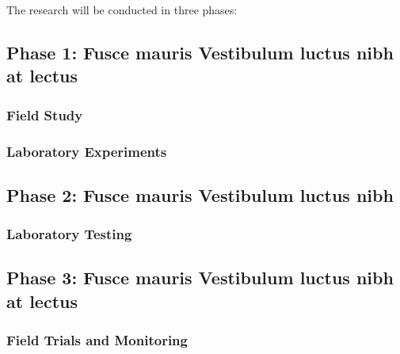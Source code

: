The research will be conducted in three phases:

\subsection{Phase 1: Fusce mauris Vestibulum luctus nibh at lectus}

\subsubsection{Field Study}
\lipsum[5]

\subsubsection{Laboratory Experiments}
\lipsum[5]



\subsection{Phase 2: Fusce mauris Vestibulum luctus nibh}

\subsubsection{Laboratory Testing}
\lipsum[5]


\subsection{Phase 3: Fusce mauris Vestibulum luctus nibh at lectus}

\subsubsection{Field Trials and Monitoring}
\lipsum[5][1-2]